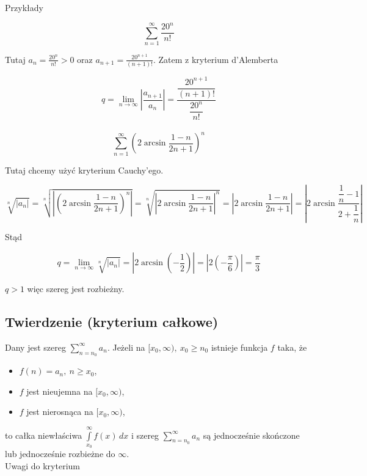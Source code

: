Przykłady

$$ \sum\limits_{n = 1}^{\infty} \frac{20^n}{n!} $$

Tutaj $ a_n = \frac{20^n}{n!} > 0 $ oraz $ a_{n + 1} = \frac{20^{n + 1}}{(n + 1)!} $. Zatem z kryterium d'Alemberta

$$ q = \lim_{n \to \infty} \left| \frac{a_{n + 1}}{a_n} \right| = \frac{ \dfrac{20^{n + 1}}{(n+1)!} }{ \dfrac{20^n}{n!} } $$ \\

$$ \sum\limits_{n = 1}^{\infty} \left( 2\arcsin \frac{1 - n}{2n + 1} \right)^n $$

Tutaj chcemy użyć kryterium Cauchy'ego.

$$ \sqrt[n]{|a_n|} = \sqrt[n]{ \left| \left( 2\arcsin \frac{1-n}{2n+1} \right)^n \right| } 
= \sqrt[n]{ \left| 2\arcsin \frac{1-n}{2n+1} \right|^n } = \left| 2\arcsin \frac{1-n}{2n+1} \right|
= \left| 2\arcsin \frac{ \dfrac{1}{n} - 1  }{ 2 + \dfrac{1}{n} } \right| $$

Stąd 

$$ q = \lim_{n \to \infty} \sqrt[n]{|a_n|} = \left| 2\arcsin \left( -\frac{1}{2} \right) \right|
= \left| 2 \left( - \frac{\pi}{6} \right) \right| = \frac{\pi}{3} $$

$q > 1$ więc szereg jest rozbieżny.


\subsection*{Twierdzenie (kryterium całkowe)}

Dany jest szereg $ \sum\limits_{n = n_0}^{\infty} a_n $. Jeżeli na $ [x_0, \infty), \ x_0 \geq n_0 $ istnieje funkcja $f$
taka, że 

\begin{itemize}
    \item $ f(n) = a_n, \ n \geq x_0 $,\
    \item $f$ jest nieujemna na $[x_0, \infty)$,
    \item $f$ jest nierosnąca na $[x_0, \infty)$,
\end{itemize}

to całka niewłaściwa $ \int\limits_{x_0}^{\infty} f(x) \,dx $ i szereg $ \sum\limits_{n = n_0}^{\infty} a_n $ są
jednocześnie skończone lub jednocześnie rozbieżne do $\infty$. \\

Uwagi do kryterium

